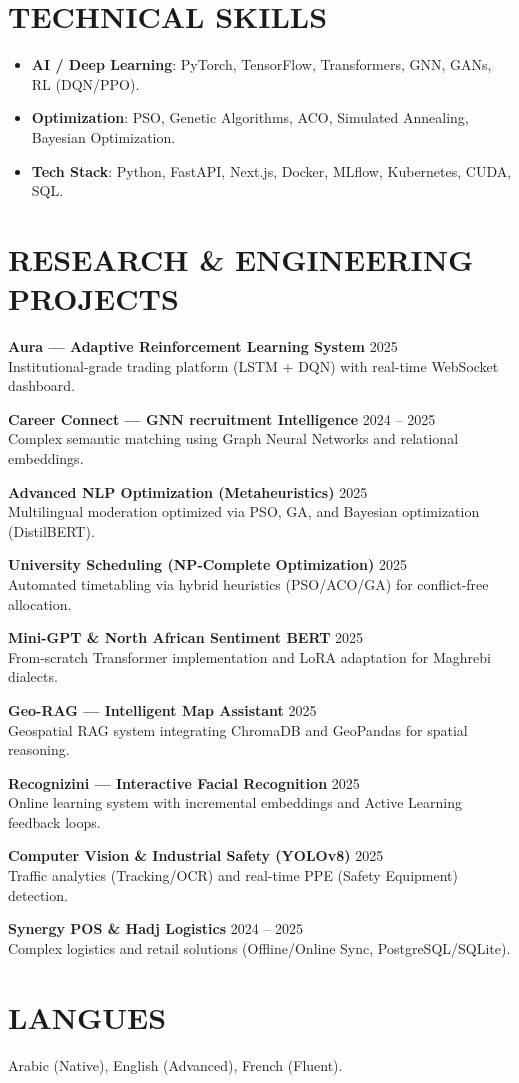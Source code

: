 \documentclass[a4paper,11pt]{article}
\begin{document}
\section{TECHNICAL SKILLS}
\begin{itemize}
    \item \textbf{AI / Deep Learning}: PyTorch, TensorFlow, Transformers, GNN, GANs, RL (DQN/PPO).
    \item \textbf{Optimization}: PSO, Genetic Algorithms, ACO, Simulated Annealing, Bayesian Optimization.
    \item \textbf{Tech Stack}: Python, FastAPI, Next.js, Docker, MLflow, Kubernetes, CUDA, SQL.
\end{itemize}

\section{RESEARCH \& ENGINEERING PROJECTS}

\textbf{Aura — Adaptive Reinforcement Learning System} \hfill 2025 \\
Institutional-grade trading platform (LSTM + DQN) with real-time WebSocket dashboard.

\textbf{Career Connect — GNN recruitment Intelligence} \hfill 2024 -- 2025 \\
Complex semantic matching using Graph Neural Networks and relational embeddings.

\textbf{Advanced NLP Optimization (Metaheuristics)} \hfill 2025 \\
Multilingual moderation optimized via PSO, GA, and Bayesian optimization (DistilBERT).

\textbf{University Scheduling (NP-Complete Optimization)} \hfill 2025 \\
Automated timetabling via hybrid heuristics (PSO/ACO/GA) for conflict-free allocation.

\textbf{Mini-GPT \& North African Sentiment BERT} \hfill 2025 \\
From-scratch Transformer implementation and LoRA adaptation for Maghrebi dialects.

\textbf{Geo-RAG — Intelligent Map Assistant} \hfill 2025 \\
Geospatial RAG system integrating ChromaDB and GeoPandas for spatial reasoning.

\textbf{Recognizini — Interactive Facial Recognition} \hfill 2025 \\
Online learning system with incremental embeddings and Active Learning feedback loops.

\textbf{Computer Vision \& Industrial Safety (YOLOv8)} \hfill 2025 \\
Traffic analytics (Tracking/OCR) and real-time PPE (Safety Equipment) detection.

\textbf{Synergy POS \& Hadj Logistics} \hfill 2024 -- 2025 \\
Complex logistics and retail solutions (Offline/Online Sync, PostgreSQL/SQLite).

\section{LANGUES}
Arabic (Native), English (Advanced), French (Fluent).
\end{document}
